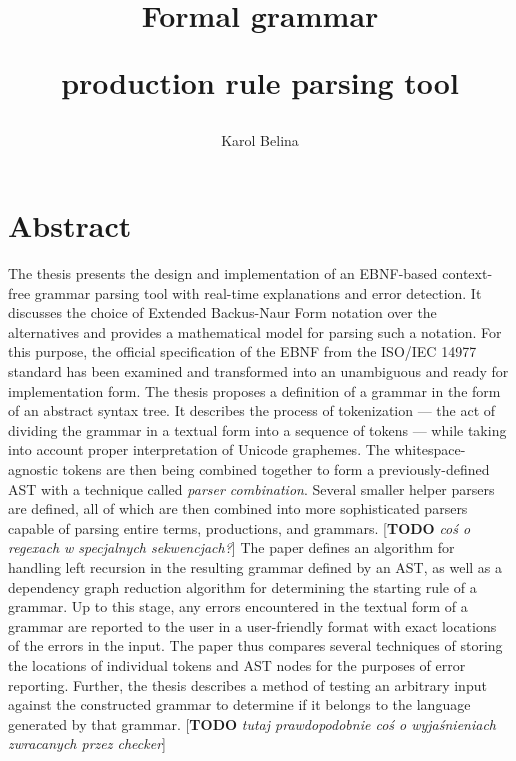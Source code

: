 \documentclass[english,engineering]{wizthesis}
\author{Karol Belina}
\title{Formal grammar\par production rule parsing tool}
\newcommand{\todo}[1]{{\color{red}[\textbf{TODO} \textit{#1}]}}
\begin{document}
\frontmatter %

\maketitle

\chapter*{Abstract}

The thesis presents the design and implementation of an EBNF-based context-free
grammar parsing tool with real-time explanations and error detection. It
discusses the choice of Extended Backus-Naur Form notation over the alternatives
and provides a mathematical model for parsing such a notation. For this purpose,
the official specification of the EBNF from the ISO/IEC 14977 standard has been
examined and transformed into an unambiguous and ready for implementation form.
The thesis proposes a definition of a grammar in the form of an abstract syntax
tree. It describes the process of tokenization --- the act of dividing the
grammar in a textual form into a sequence of tokens --- while taking into
account proper interpretation of Unicode graphemes. The whitespace-agnostic
tokens are then being combined together to form a previously-defined AST with a
technique called \textit{parser combination}. Several smaller helper parsers are
defined, all of which are then combined into more sophisticated parsers capable
of parsing entire terms, productions, and grammars. \todo{coś o regexach w
specjalnych sekwencjach?} The paper defines an algorithm for handling left
recursion in the resulting grammar defined by an AST, as well as a dependency
graph reduction algorithm for determining the starting rule of a grammar. Up to
this stage, any errors encountered in the textual form of a grammar are reported
to the user in a user-friendly format with exact locations of the errors in the
input. The paper thus compares several techniques of storing the locations of
individual tokens and AST nodes for the purposes of error reporting. Further,
the thesis describes a method of testing an arbitrary input against the
constructed grammar to determine if it belongs to the language generated by that
grammar.
\todo{tutaj prawdopodobnie coś o wyjaśnieniach zwracanych przez checker}
\end{document}
